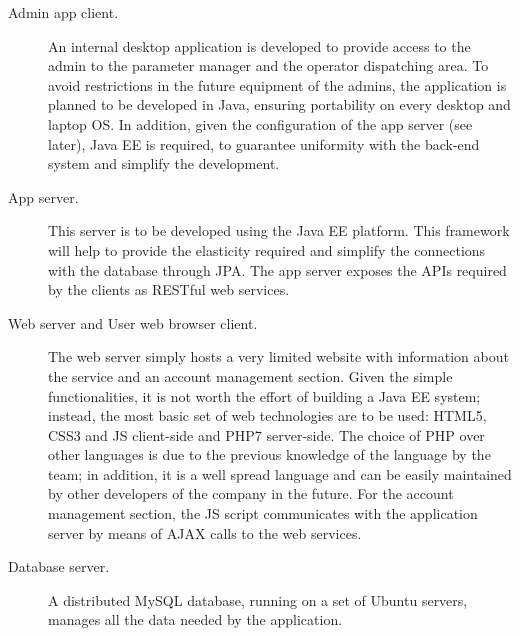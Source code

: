 \begin{description}
		\item[Admin app client.] An internal desktop application is developed to provide access to the admin to the parameter manager and the operator dispatching area. To avoid restrictions in the future equipment of the admins, the application is planned to be developed in Java, ensuring portability on every desktop and laptop OS. In addition, given the configuration of the app server (see later), Java EE is required, to guarantee uniformity with the back-end system and simplify the development.

		\item[App server.] This server is to be developed using the Java EE platform. This framework will help to provide the elasticity required and simplify the connections with the database through JPA. The app server exposes the APIs required by the clients as RESTful web services.

		\item[Web server and User web browser client.] The web server simply hosts a very limited website with information about the service and an account management section. Given the simple functionalities, it is not worth the effort of building a Java EE system; instead, the most basic set of web technologies are to be used: HTML5, CSS3 and JS client-side and PHP7 server-side. The choice of PHP over other languages is due to the previous knowledge of the language by the team; in addition, it is a well spread language and can be easily maintained by other developers of the company in the future. For the account management section, the JS script communicates with the application server by means of AJAX calls to the web services.

		\item[Database server.] A distributed MySQL database, running on a set of Ubuntu servers, manages all the data needed by the application.
	\end{description}

